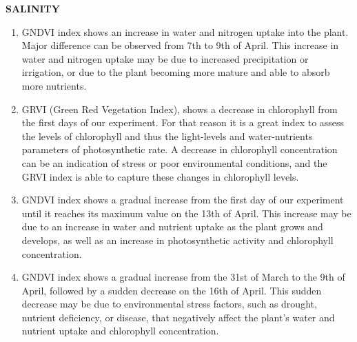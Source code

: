\documentclass{article}
\begin{document}
                            \newpage
                            \textbf{SALINITY}
                            \vspace*{1\baselineskip}
                            
                            \begin{enumerate}
                                \item GNDVI index shows an increase in water and nitrogen uptake into the plant. Major difference can be observed from 7th to 9th of April. This increase in water and nitrogen uptake may be due to increased precipitation or irrigation, or due to the plant becoming more mature and able to absorb more nutrients.\par
                                \vspace*{1\baselineskip}

                            
                                \item GRVI (Green Red Vegetation Index), shows a decrease in chlorophyll from the first days of our experiment. For that reason it is a great index to assess the levels of chlorophyll and thus the light-levels and water-nutrients parameters of photosynthetic rate. A decrease in chlorophyll concentration can be an indication of stress or poor environmental conditions, and the GRVI index is able to capture these changes in chlorophyll levels.\par
                                \vspace*{1\baselineskip}

                                \item GNDVI index shows a gradual increase from the first day of our experiment until it reaches its maximum value on the 13th of April. This increase may be due to an increase in water and nutrient uptake as the plant grows and develops, as well as an increase in photosynthetic activity and chlorophyll concentration.\par
                                \vspace*{1\baselineskip}
                            
                                \item GNDVI index shows a gradual increase from the 31st of March to the 9th of April, followed by a sudden decrease on the 16th of April. This sudden decrease may be due to environmental stress factors, such as drought, nutrient deficiency, or disease, that negatively affect the plant's water and nutrient uptake and chlorophyll concentration.\par
                             \vspace*{3\baselineskip}
                            \end{enumerate}
                            
\end{document}

